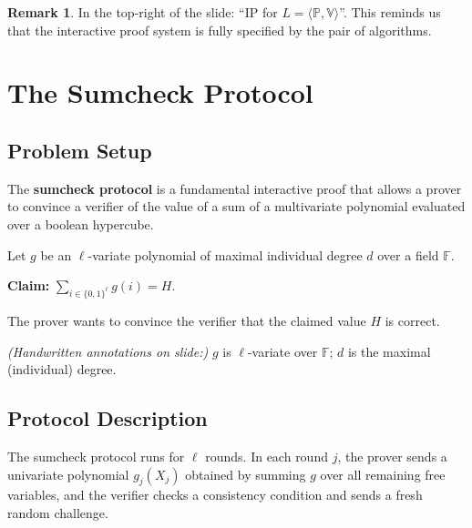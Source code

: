 \documentclass[11pt]{article}
\theoremstyle{plain}
\theoremstyle{definition}
\newtheorem{remark}[theorem]{Remark}
\newcommand{\F}{\mathbb{F}}
\begin{document}
\begin{remark}
  In the top-right of the slide: ``IP for $L = \langle \mathbb{P}, \mathbb{V} \rangle$''. This
  reminds us that the interactive proof system is fully specified by the pair of algorithms.
\end{remark}

\section{The Sumcheck Protocol}

\subsection{Problem Setup}

The \textbf{sumcheck protocol} is a fundamental interactive proof that allows a prover to convince
a verifier of the value of a sum of a multivariate polynomial evaluated over a boolean hypercube.

\medskip

\begin{tcolorbox}[colback=blue!5!white, colframe=blue!60!black, title={Sumcheck Problem Statement}]
  Let $g$ be an $\ell$-variate polynomial of maximal individual degree $d$ over a field $\F$.
  \medskip

  \textbf{Claim:} $\displaystyle\sum_{i \in \{0,1\}^\ell} g(i) = H$.

  \medskip
  The prover wants to convince the verifier that the claimed value $H$ is correct.
\end{tcolorbox}

\medskip
\textit{(Handwritten annotations on slide:)} $g$ is $\ell$-variate over $\F$; $d$ is the maximal
(individual) degree.

\subsection{Protocol Description}

The sumcheck protocol runs for $\ell$ rounds. In each round $j$, the prover sends a univariate
polynomial $g_j(X_j)$ obtained by summing $g$ over all remaining free variables, and the verifier
checks a consistency condition and sends a fresh random challenge.

\bigskip
\end{document}
